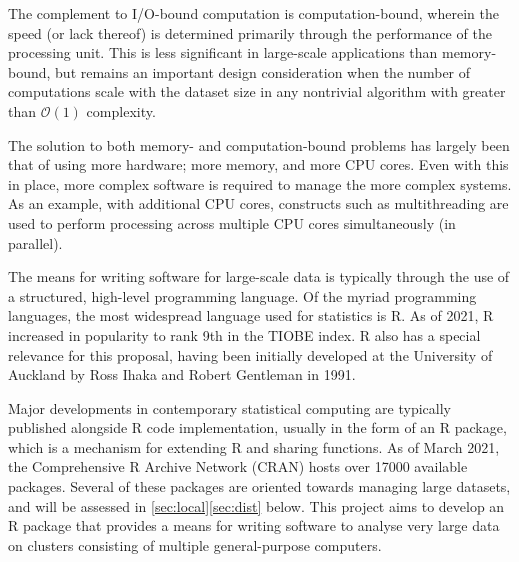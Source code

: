 The complement to I/O-bound computation is computation-bound,
wherein the speed (or lack thereof) is determined primarily through the
performance of the processing unit. This is less significant in
large-scale applications than memory-bound, but remains an important
design consideration when the number of computations scale with the
dataset size in any nontrivial algorithm with greater than
\(\mathcal{O}(1)\) complexity.

The solution to both memory- and computation-bound problems has largely
been that of using more hardware; more memory, and more CPU cores. Even
with this in place, more complex software is required to manage the more
complex systems. As an example, with additional CPU cores, constructs
such as multithreading are used to perform processing across multiple
CPU cores simultaneously (in parallel).

The means for writing software for large-scale data is typically through
the use of a structured, high-level programming language. Of the myriad
programming languages, the most widespread language used for statistics
is R. As of 2021, R increased in popularity to rank 9th in the TIOBE
index. R also has a special relevance for this proposal, having been
initially developed at the University of Auckland by Ross Ihaka and
Robert Gentleman in 1991\cite{ihaka1996r}.

Major developments in contemporary statistical computing are typically
published alongside R code implementation, usually in the form of an R
package, which is a mechanism for extending R and sharing functions. As
of March 2021, the Comprehensive R Archive Network (CRAN) hosts over
17000 available packages\cite{team20:_r}. Several of these packages are
oriented towards managing large datasets, and will be assessed in
\ref{sec:local}\ref{sec:dist} below. This project aims to develop an R
package that provides a means for writing software to analyse very large
data on clusters consisting of multiple general-purpose computers.